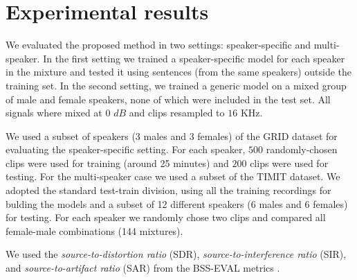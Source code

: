 \section{Experimental results}
\label{sec:experiments}

 We evaluated the proposed method in two settings: speaker-specific and multi-speaker. In the first setting 
we trained a speaker-specific model for each speaker in the mixture and tested it using sentences (from the same speakers) outside the training set. 
In the second setting, we trained a generic model on a mixed group of male and female speakers, none of which were included in the test set.
All signals where mixed at 0 $dB$ and clips resampled to $16$ KHz. 

 We used a subset of speakers (3 males and 3 females) of the GRID dataset \cite{cooke2006audio} for evaluating the speaker-specific setting.
For each speaker, $500$ randomly-chosen clips were used for training (around 25 minutes) and $200$ clips were used for testing.
For the multi-speaker case we used a subset of the TIMIT dataset. We adopted the standard test-train division, using all the training recordings for bulding the models
and a subset of 12 different speakers (6 males and 6 females) for testing. For each speaker we randomly chose two clips and compared
all female-male combinations (144 mixtures). 

 We used the \emph{source-to-distortion ratio} (SDR), \emph{source-to-interference ratio} (SIR), and
\emph{source-to-artifact ratio} (SAR) from the BSS-EVAL metrics \cite{vincent2006performance}. 
%
%

